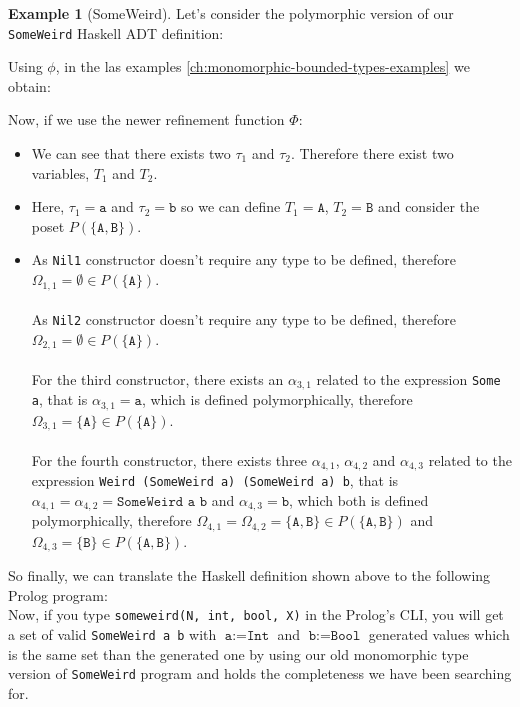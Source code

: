 \documentclass{report}
\theoremstyle{definition}
\newtheorem{example}{Example}[section]
\theoremstyle{definition}
\newcommand{\ttt}[1]{\texttt{#1}}
\begin{document}
	\begin{example}[SomeWeird]
		Let's consider the polymorphic version of our \ttt{SomeWeird} Haskell ADT definition:
		
		Using $\phi$, in the las examples \ref{ch:monomorphic-bounded-types-examples} we obtain:
		
		Now, if we use the newer refinement function $\Phi$:
		\begin{itemize}
			\item We can see that there exists two $\tau_1$ and $\tau_2$. Therefore there exist two variables, $T_1$ and $T_2$.
			\item Here, $\tau_1 = \ttt{a}$ and $\tau_2 = \ttt{b}$ so we can define $T_1 = \ttt{A}$, $T_2 = \ttt{B}$ and consider the poset $P(\{\ttt{A}, \ttt{B}\})$.
			\item As \ttt{Nil1} constructor doesn't require any type to be defined, therefore $\Omega_{1,1} = \emptyset \in P(\{ \ttt{A} \})$. \\\\
			      As \ttt{Nil2} constructor doesn't require any type to be defined, therefore $\Omega_{2,1} = \emptyset \in P(\{ \ttt{A} \})$. \\\\
			      For the third constructor, there exists an $\alpha_{3,1}$ related to the expression \ttt{Some a}, that is $\alpha_{3,1} = \ttt{a}$, which is defined polymorphically, therefore $\Omega_{3,1} = \{\ttt{A}\} \in P(\{ \ttt{A} \})$. \\\\
			      For the fourth constructor, there exists three $\alpha_{4,1}$, $\alpha_{4,2}$ and $\alpha_{4,3}$ related to the expression \ttt{Weird (SomeWeird a) (SomeWeird a) b}, that is $\alpha_{4,1} = \alpha_{4,2} = \ttt{SomeWeird a b}$ and $\alpha_{4,3} = \ttt{b}$, which both is defined polymorphically, therefore $\Omega_{4,1} = \Omega_{4,2} = \{\ttt{A}, \ttt{B}\} \in P(\{ \ttt{A} , \ttt{B} \})$ and $\Omega_{4,3} = \{\ttt{B}\} \in P(\{ \ttt{A} , \ttt{B} \})$.
		\end{itemize}
		So finally, we can translate the Haskell definition shown above to the following Prolog program:\\
		
		Now, if you type \ttt{someweird(N, int, bool, X)} in the Prolog's CLI, you will get a set of valid \ttt{SomeWeird a b} with $\ttt{a} := \ttt{Int}$ and $\ttt{b} := \ttt{Bool}$ generated values which is the same set than the generated one by using our old monomorphic type version of \ttt{SomeWeird} program and holds the completeness we have been searching for.\\
	\end{example}
\end{document}
